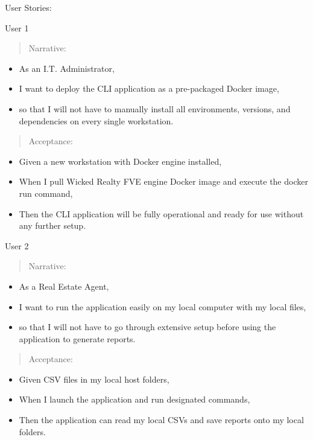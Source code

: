 User Stories:

User 1

\begin{quote}
Narrative:
\end{quote}

\begin{itemize}
\item
  As an I.T. Administrator,
\item
  I want to deploy the CLI application as a pre-packaged Docker image,
\item
  so that I will not have to manually install all environments,
  versions, and dependencies on every single workstation.
\end{itemize}

\begin{quote}
Acceptance:
\end{quote}

\begin{itemize}
\item
  Given a new workstation with Docker engine installed,
\item
  When I pull Wicked Realty FVE engine Docker image and execute the
  docker run command,
\item
  Then the CLI application will be fully operational and ready for use
  without any further setup.
\end{itemize}

User 2

\begin{quote}
Narrative:
\end{quote}

\begin{itemize}
\item
  As a Real Estate Agent,
\item
  I want to run the application easily on my local computer with my
  local files,
\item
  so that I will not have to go through extensive setup before using the
  application to generate reports.
\end{itemize}

\begin{quote}
Acceptance:
\end{quote}

\begin{itemize}
\item
  Given CSV files in my local host folders,
\item
  When I launch the application and run designated commands,
\item
  Then the application can read my local CSVs and save reports onto my
  local folders.
\end{itemize}

